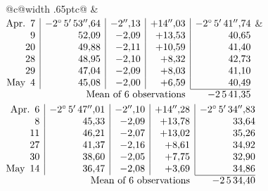 \noindent\begin{tabular}{@{}c@{\hspace{.4em}\vrule width .65pt\hspace{.4em}}c@{}}
 &
 \\[.18ex]
\(\begin{array}[t]{@{}r|r|r|r|r@{}}
\text{Apr.}\enspace 7 & -2^\circ\,5'\,53''{,}64 & -2''{,}13 & +14''{,}03 & -2^\circ\,5'\,41''{,}74\\
9 & 52{,}09 & -2{,}09 & +13{,}53 & 40{,}65\\
20 & 49{,}88 & -2{,}11 & +10{,}59 & 41{,}40\\
28 & 48{,}95 & -2{,}10 & +8{,}32 & 42{,}73\\
29 & 47{,}04 & -2{,}09 & +8{,}03 & 41{,}10\\
\text{May}\enspace 4 & 45{,}08 & -2{,}00 & +6{,}59 & 40{,}49\\
\cline{5-5}
\multicolumn{4}{r}{\text{Mean of 6 observations}} & -2\,5\,41{,}35
\end{array}\)
&
\(\begin{array}[t]{@{}r|r|r|r|r@{}}
\text{Apr.}\enspace 6 & -2^\circ\,5'\,47''{,}01 & -2''{,}10 & +14''{,}28 & -2^\circ\,5'\,34''{,}83\\
8 & 45{,}33 & -2{,}09 & +13{,}78 & 33{,}64\\
11 & 46{,}21 & -2{,}07 & +13{,}02 & 35{,}26\\
27 & 41{,}37 & -2{,}16 & +8{,}61 & 34{,}92\\
30 & 38{,}60 & -2{,}05 & +7{,}75 & 32{,}90\\
\text{May}\enspace 14 & 36{,}47 & -2{,}08 & +3{,}69 & 34{,}86\\
\cline{5-5}
\multicolumn{4}{r}{\text{Mean of 6 observations}} & -2\,5\,34{,}40
\end{array}\)
\end{tabular}\par\medskip

\par\clearpage
\noindent\makebox[12mm][l]{}\par\medskip

